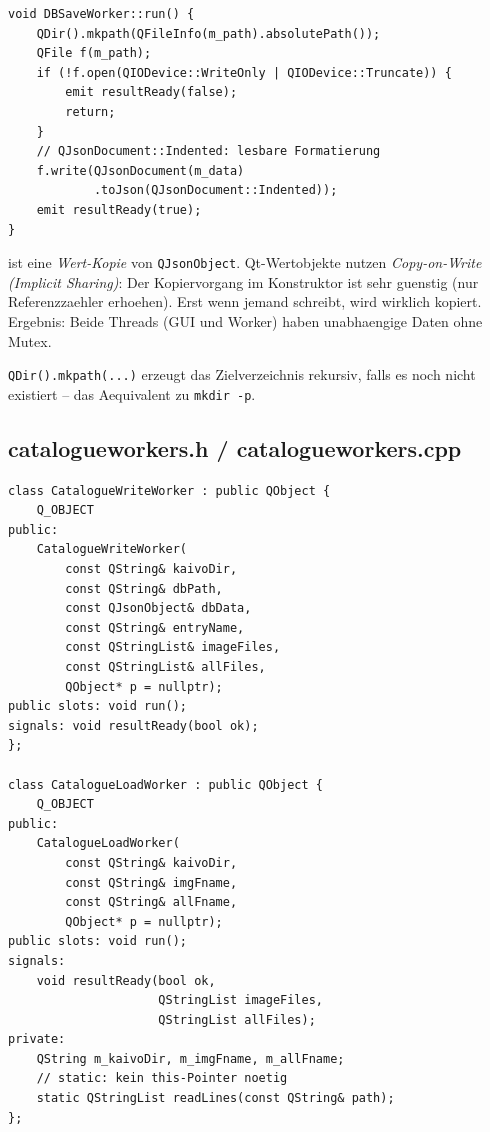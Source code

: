 \begin{lstlisting}[caption={DBSaveWorker::run}]
void DBSaveWorker::run() {
    QDir().mkpath(QFileInfo(m_path).absolutePath());
    QFile f(m_path);
    if (!f.open(QIODevice::WriteOnly | QIODevice::Truncate)) {
        emit resultReady(false);
        return;
    }
    // QJsonDocument::Indented: lesbare Formatierung
    f.write(QJsonDocument(m_data)
            .toJson(QJsonDocument::Indented));
    emit resultReady(true);
}
\end{lstlisting}

 ist eine \emph{Wert-Kopie} von
\verb|QJsonObject|. Qt-Wertobjekte nutzen
\emph{Copy-on-Write (Implicit Sharing)}: Der Kopiervorgang
im Konstruktor ist sehr guenstig (nur Referenzzaehler
erhoehen). Erst wenn jemand schreibt, wird wirklich kopiert.
Ergebnis: Beide Threads (GUI und Worker) haben
unabhaengige Daten ohne Mutex.

\verb|QDir().mkpath(...)| erzeugt das Zielverzeichnis
rekursiv, falls es noch nicht existiert --
das Aequivalent zu \texttt{mkdir -p}.

\subsection{catalogueworkers.h / catalogueworkers.cpp}

\begin{lstlisting}[style=header, caption={catalogueworkers.h}]
class CatalogueWriteWorker : public QObject {
    Q_OBJECT
public:
    CatalogueWriteWorker(
        const QString& kaivoDir,
        const QString& dbPath,
        const QJsonObject& dbData,
        const QString& entryName,
        const QStringList& imageFiles,
        const QStringList& allFiles,
        QObject* p = nullptr);
public slots: void run();
signals: void resultReady(bool ok);
};

class CatalogueLoadWorker : public QObject {
    Q_OBJECT
public:
    CatalogueLoadWorker(
        const QString& kaivoDir,
        const QString& imgFname,
        const QString& allFname,
        QObject* p = nullptr);
public slots: void run();
signals:
    void resultReady(bool ok,
                     QStringList imageFiles,
                     QStringList allFiles);
private:
    QString m_kaivoDir, m_imgFname, m_allFname;
    // static: kein this-Pointer noetig
    static QStringList readLines(const QString& path);
};
\end{lstlisting}


